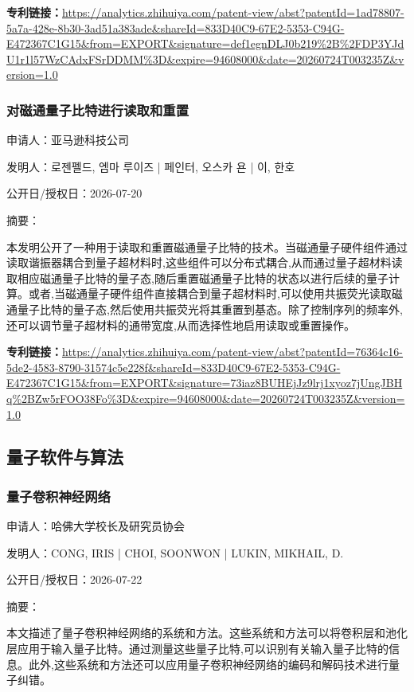 \documentclass[12pt,a4paper]{ctexart}
\begin{document}
\noindent\textbf{专利链接：}\url{https://analytics.zhihuiya.com/patent-view/abst?patentId=1ad78807-5a7a-428e-8b30-3ad51a383ade&shareId=833D40C9-67E2-5353-C94G-E472367C1G15&from=EXPORT&signature=def1egnDLJ0b219%2B%2FDP3YJdU1r1l57WzCAdxFSrDDMM%3D&expire=94608000&date=20260724T003235Z&version=1.0}

\subsubsection{ 对磁通量子比特进行读取和重置 }

申请人：亚马逊科技公司

发明人：로젠펠드, 엠마 루이즈 | 페인터, 오스카 욘 | 이, 한호

公开日/授权日：2026-07-20

摘要：

本发明公开了一种用于读取和重置磁通量子比特的技术。当磁通量子硬件组件通过读取谐振器耦合到量子超材料时,这些组件可以分布式耦合,从而通过量子超材料读取相应磁通量子比特的量子态,随后重置磁通量子比特的状态以进行后续的量子计算。或者,当磁通量子硬件组件直接耦合到量子超材料时,可以使用共振荧光读取磁通量子比特的量子态,然后使用共振荧光将其重置到基态。除了控制序列的频率外,还可以调节量子超材料的通带宽度,从而选择性地启用读取或重置操作。

\noindent\textbf{专利链接：}\url{https://analytics.zhihuiya.com/patent-view/abst?patentId=76364c16-5de2-4583-8790-31574c5e228f&shareId=833D40C9-67E2-5353-C94G-E472367C1G15&from=EXPORT&signature=73iaz8BUHEjJz9lrj1xyoz7jUngJBHq%2BZw5rFOO38Fo%3D&expire=94608000&date=20260724T003235Z&version=1.0}


\subsection{ 量子软件与算法 }

\subsubsection{ 量子卷积神经网络 }

申请人：哈佛大学校长及研究员协会

发明人：CONG, IRIS | CHOI, SOONWON | LUKIN, MIKHAIL, D.

公开日/授权日：2026-07-22

摘要：

本文描述了量子卷积神经网络的系统和方法。这些系统和方法可以将卷积层和池化层应用于输入量子比特。通过测量这些量子比特,可以识别有关输入量子比特的信息。此外,这些系统和方法还可以应用量子卷积神经网络的编码和解码技术进行量子纠错。
\end{document}
